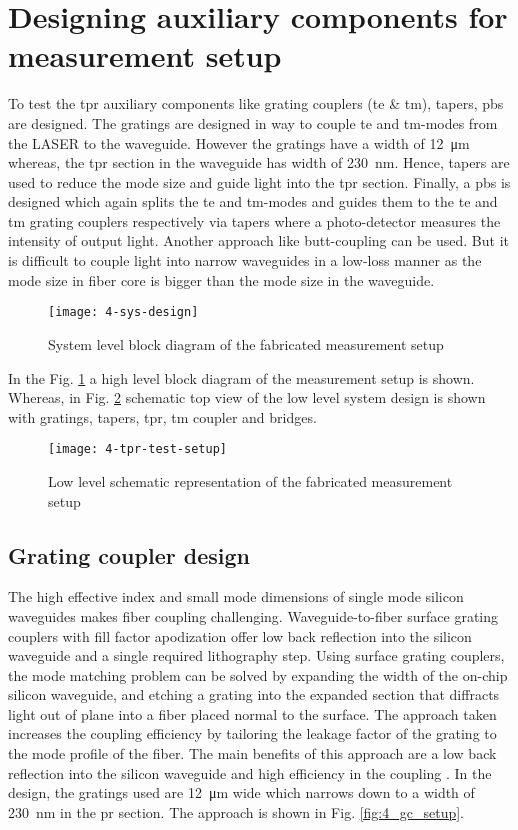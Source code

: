 \documentclass[../report.tex]{subfiles}
\begin{document}
\section{Designing auxiliary components for measurement setup}
To test the \gls{tpr} auxiliary components like grating couplers (\gls{te} \& \gls{tm}), tapers, \gls{pbs} are designed. The gratings are designed in way to couple \gls{te} and \gls{tm}-modes from the LASER to the waveguide. However the gratings have a width of \SI{12}{\micro \meter} whereas, the \gls{tpr} section in the waveguide has width of \SI{230}{\nano \meter}. Hence, tapers are used to reduce the mode size and guide light into the \gls{tpr} section. Finally, a \gls{pbs} is designed which again splits the \gls{te} and \gls{tm}-modes and guides them to the \gls{te} and \gls{tm} grating couplers respectively via tapers where a photo-detector measures the intensity of output light. Another approach like butt-coupling can be used. But it is difficult to couple light into narrow waveguides in a low-loss manner as the mode size in fiber core is bigger than the mode size in the waveguide.  

\begin{figure}[H] %
	\centering
	\texttt{[image: 4-sys-design]}
	\caption{System level block diagram of the fabricated measurement setup}
	\label{fig:4_sys_design}
\end{figure}
\noindent In the Fig. \ref{fig:4_sys_design} a high level block diagram of the measurement setup is shown. Whereas, in Fig. \ref{fig:4_tpr_test_setup} schematic top view of the low level system design is shown with gratings, tapers, \gls{tpr}, \gls{tm} coupler and bridges. 
\begin{figure}[H] %
	\centering
	\texttt{[image: 4-tpr-test-setup]}
	\caption{Low level schematic representation of the fabricated measurement setup}
	\label{fig:4_tpr_test_setup}
\end{figure}

\subsection{Grating coupler design}
The high effective index and small mode dimensions of single mode silicon waveguides makes fiber coupling challenging. Waveguide-to-fiber surface grating couplers with fill factor apodization offer low back reflection into the silicon waveguide and a single required lithography step. Using surface grating couplers, the mode matching problem can be solved by expanding the width of the on-chip silicon waveguide, and etching a grating into the expanded section that diffracts light out of plane into a fiber placed normal to the surface. The approach taken increases the coupling efficiency by tailoring the leakage factor of the grating to the mode profile of the fiber. The main benefits of this approach are a low back reflection into the silicon waveguide and high efficiency in the coupling \cite{grating_coupler}. In the design, the gratings used are \SI{12}{\micro\meter} wide which narrows down to a width of \SI{230}{\nano\meter} in the \gls{pr} section. The approach is shown in Fig. \ref{fig:4_gc_setup}.
\end{document}
